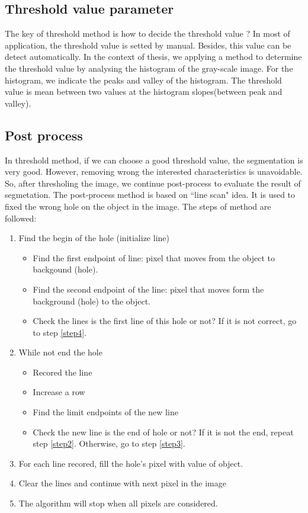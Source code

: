 \subsection{Threshold value parameter}
The key of threshold method is how to decide the threshold value ? In most of application, the threshold value is setted by manual. Besides, this value can be detect automatically. In the context of thesis, we applying a method to determine the threshold value by analysing the histogram of the gray-scale image. For the histogram, we indicate the peaks and valley of the histogram. The threshold value is mean between two values at the histogram slopes(between peak and valley).
\subsection{Post process}\label{postprocess}
In threshold method, if we can choose a good threshold value, the segmentation is very good. However, removing  wrong the interested characteristics is unavoidable. So, after thresholing the image, we continue post-process to evaluate the result of segmetation. The post-process method is based on ``line scan" idea. It is used to fixed the wrong hole on the object in the image. The steps of method are followed:
\begin{enumerate}
	\item Find the begin of the hole (initialize line)
		\begin{itemize}
			\item Find the first endpoint of line: pixel that moves from the object to backgound (hole).
			\item Find the second endpoint of the line: pixel that moves form the background (hole) to the object.
			\item Check the lines is the first line of this hole or not? If it is not correct, go to step \ref{step4}.
		\end{itemize}
	\item \label{step2}While not end the hole
		\begin{itemize}
			\item Recored the line
			\item Increase a row
			\item Find the limit endpoints of the new line
			\item Check the new line is the end of hole or not? If it is not the end, repeat step \ref{step2}. Otherwise, go to step \ref{step3}.
		\end{itemize}
	\item \label{step3}For each line recored, fill the hole's pixel with value of object.
	\item \label{step4}Clear the lines and continue with next pixel in the image
	\item The algorithm will stop when all pixels are considered.
\end{enumerate}
